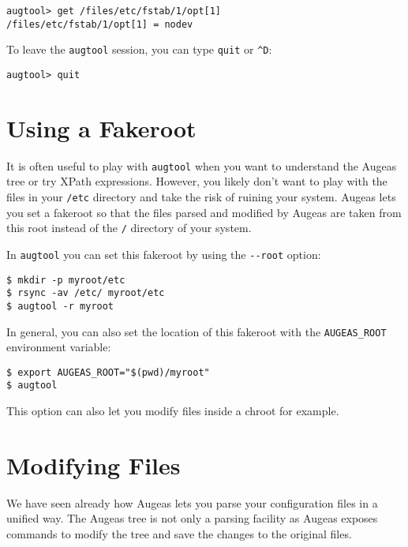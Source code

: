 \begin{verbatim}
augtool> get /files/etc/fstab/1/opt[1]
/files/etc/fstab/1/opt[1] = nodev
\end{verbatim}


To leave the \verb!augtool! session, you can type \verb!quit! or \verb!^D!:

\begin{verbatim}
augtool> quit
\end{verbatim}


\section{Using a Fakeroot}

It is often useful to play with \verb!augtool! when you want to understand the Augeas tree or try XPath expressions. However, you likely don't want to play with the files in your \nolinkurl{/etc} directory and take the risk of ruining your system. Augeas lets you set a fakeroot so that the files parsed and modified by Augeas are taken from this root instead of the \nolinkurl{/} directory of your system.

 

In \verb!augtool! you can set this fakeroot by using the \verb!--root! option:

\begin{verbatim}
$ mkdir -p myroot/etc
$ rsync -av /etc/ myroot/etc
$ augtool -r myroot
\end{verbatim}

In general, you can also set the location of this fakeroot with the \verb!AUGEAS_ROOT! environment variable:

\begin{verbatim}
$ export AUGEAS_ROOT="$(pwd)/myroot"
$ augtool
\end{verbatim}

This option can also let you modify files inside a chroot for example.

\section{Modifying Files}

We have seen already how Augeas lets you parse your configuration files in a unified way. The Augeas tree is not only a parsing facility as Augeas exposes commands to modify the tree and save the changes to the original files.

